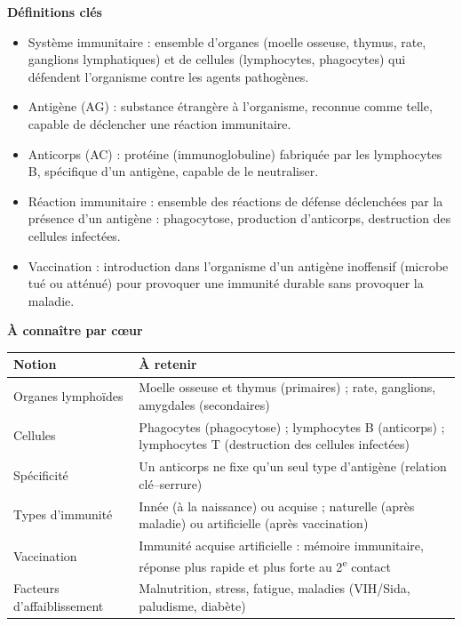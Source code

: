 \documentclass[11pt]{article}
\newcommand{\cle}[1]{{\popxbold\color{popdark}#1}}
\begin{document}
\begin{bilan}
\textbf{Définitions clés}
\begin{itemize}
  \item \cle{Système immunitaire} : ensemble d'organes (moelle osseuse, thymus, rate, ganglions lymphatiques) et de cellules (lymphocytes, phagocytes) qui défendent l'organisme contre les agents pathogènes.
  \item \cle{Antigène (AG)} : substance étrangère à l'organisme, reconnue comme telle, capable de déclencher une réaction immunitaire.
  \item \cle{Anticorps (AC)} : protéine (immunoglobuline) fabriquée par les lymphocytes B, spécifique d'un antigène, capable de le neutraliser.
  \item \cle{Réaction immunitaire} : ensemble des réactions de défense déclenchées par la présence d'un antigène : phagocytose, production d'anticorps, destruction des cellules infectées.
  \item \cle{Vaccination} : introduction dans l'organisme d'un antigène inoffensif (microbe tué ou atténué) pour provoquer une immunité durable sans provoquer la maladie.
\end{itemize}

\textbf{À connaître par cœur}
\begin{center}
\begin{tabularx}{\linewidth}{|l|X|}\hline
\rowcolor{popblueL} \textbf{Notion} & \textbf{À retenir} \\ \hline
Organes lymphoïdes & Moelle osseuse et thymus (primaires) ; rate, ganglions, amygdales (secondaires) \\ \hline
Cellules & Phagocytes (phagocytose) ; lymphocytes B (anticorps) ; lymphocytes T (destruction des cellules infectées) \\ \hline
Spécificité & Un anticorps ne fixe qu'un seul type d'antigène (relation clé--serrure) \\ \hline
Types d'immunité & Innée (à la naissance) ou acquise ; naturelle (après maladie) ou artificielle (après vaccination) \\ \hline
Vaccination & Immunité acquise artificielle : mémoire immunitaire, réponse plus rapide et plus forte au 2\textsuperscript{e} contact \\ \hline
Facteurs d'affaiblissement & Malnutrition, stress, fatigue, maladies (VIH/Sida, paludisme, diabète) \\ \hline
\end{tabularx}
\end{center}


\end{bilan}
\end{document}
